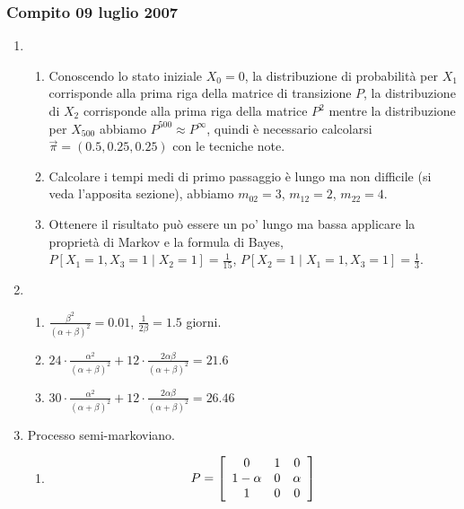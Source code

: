 \documentclass{article}
\begin{document}
\subsubsection{Compito 09 luglio 2007}
\begin{enumerate}

    \item\begin{enumerate}[label=\alph*)]
        \item Conoscendo lo stato iniziale $X_0 = 0$, la distribuzione di probabilità per $X_1$ corrisponde alla prima riga della matrice di transizione $P$, la distribuzione di $X_2$ corrisponde alla prima riga della matrice $P^2$ mentre la distribuzione per $X_{500}$ abbiamo $P^{500} \approx P^{\infty}$, quindi è necessario calcolarsi $\vec{\pi} = (0.5,0.25,0.25)$ con le tecniche note. 

        \item Calcolare i tempi medi di primo passaggio è lungo ma non difficile (si veda l'apposita sezione), abbiamo $m_{02} = 3$, $m_{12} = 2$, $m_{22} = 4$.  

        \item Ottenere il risultato può essere un po' lungo ma bassa applicare la proprietà di Markov e la formula di Bayes, $P[X_1 = 1, X_3 = 1\mid X_2 = 1] = \frac{1}{15}$, $P[X_2 = 1 \mid X_1 = 1, X_3 = 1] = \frac{1}{3}$.
    \end{enumerate}
    
    \item\begin{enumerate}[label=\alph*)]
        \item $\frac{\beta^2}{(\alpha + \beta)^2} = 0.01$, $\frac{1}{2\beta} = 1.5$ giorni.
        \item $24\cdot\frac{\alpha^2}{(\alpha + \beta)^2}+12\cdot\frac{2\alpha\beta}{(\alpha + \beta)^2} = 21.6$
        \item $30\cdot\frac{\alpha^2}{(\alpha + \beta)^2}+12\cdot\frac{2\alpha\beta}{(\alpha + \beta)^2} = 26.46$
    \end{enumerate}
    
    \item Processo semi-markoviano.
    \begin{enumerate}[label=\alph*)]
        \item \begin{align*}
        P = \left[\begin{array}{c c c}
        0 & 1 & 0\\1-\alpha & 0 & \alpha\\1 & 0 & 0
        \end{array}\right]
        \end{align*}


\end{enumerate}
\end{enumerate}
\end{document}
